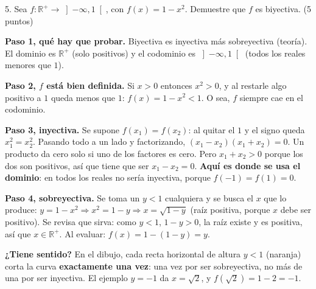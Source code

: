 \documentclass[11pt]{article}
\begin{document}
5. Sea $f:\mathbb R^+\to\left]-\infty,1\right[$, con $f(x)=1-x^2$. Demuestre que \colorbox{green!35}{$f$ es biyectiva}. \hfill (5 puntos)

\begin{center}
\end{center}


\begin{explica}
\textbf{Paso 1, qué hay que probar.} Biyectiva es inyectiva más sobreyectiva (teoría). El dominio es $\mathbb R^+$ (solo positivos) y el codominio es $\left]-\infty,1\right[$ (todos los reales menores que $1$).

\textbf{Paso 2, $f$ está bien definida.} Si $x>0$ entonces $x^2>0$, y al restarle algo positivo a $1$ queda menos que $1$: $f(x)=1-x^2<1$. O sea, $f$ siempre cae en el codominio.

\textbf{Paso 3, inyectiva.} Se supone $f(x_1)=f(x_2)$: al quitar el $1$ y el signo queda $x_1^2=x_2^2$. Pasando todo a un lado y factorizando, $(x_1-x_2)(x_1+x_2)=0$. Un producto da cero solo si uno de los factores es cero. Pero $x_1+x_2>0$ porque los dos son positivos, así que tiene que ser $x_1-x_2=0$. \textbf{Aquí es donde se usa el dominio}: en todos los reales no sería inyectiva, porque $f(-1)=f(1)=0$.

\textbf{Paso 4, sobreyectiva.} Se toma un $y<1$ cualquiera y se busca el $x$ que lo produce: $y=1-x^2\Rightarrow x^2=1-y\Rightarrow x=\sqrt{1-y}$ (raíz positiva, porque $x$ debe ser positivo). Se revisa que sirva: como $y<1$, $1-y>0$, la raíz existe y es positiva, así que $x\in\mathbb R^+$. Al evaluar: $f(x)=1-(1-y)=y$.

\textbf{¿Tiene sentido?} En el dibujo, cada recta horizontal de altura $y<1$ (naranja) corta la curva \textbf{exactamente una vez}: una vez por ser sobreyectiva, no más de una por ser inyectiva. El ejemplo $y=-1$ da $x=\sqrt2$, y $f(\sqrt2)=1-2=-1$.
\end{explica}
\end{document}
